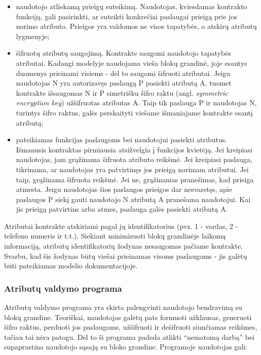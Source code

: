 \begin{itemize}
    \item naudotojo atliekamą prieigų suteikimą. Naudotojas, kviesdamas kontrakto funkciją, gali pasirinkti,
    ar suteikti konkrečiai paslaugai prieigą prie jos norimo atributo. Prieigos yra valdomos ne visos tapatybės, o
    atskirų atributų lygmenyje;

    \item šifruotų atributų saugojimą. Kontrakte saugomi naudotojo tapatybės atributai. Kadangi modelyje naudojama vieša blokų
    grandinė, joje esantys duomenys prieinami visiems - dėl to saugomi šifruoti atributai. Jeigu naudotojas N
    yra autorizavęs paslaugą P pasiekti atributą A, tuomet kontrakte išsaugomas N ir P simetrišku šifro raktu (angl.
    \textit{symmetric encryption key}) užšifruotas atributas A. Taip tik paslauga P
    ir naudotojas N, turintys šifro raktus, galės perskaityti viešame išmaniajame kontrakte esantį atributą;

    \item pateikiamas funkcijas paslaugoms bei naudotojui pasiekti atributus. Išmanusis kontraktas pirmiausia atsižvelgia
    į funkcijos kvietėją. Jei kreipiasi naudotojas, jam grąžinama šifruota atributo reikšmė. Jei kreipiasi paslauga, tikrinama,
    ar naudotojas yra patvirtinęs jos prieigą norimam atributui. Jei taip, grąžinama šifruota reikšmė. Jei ne, grąžinamas pranešimas,
    kad prieiga atmesta. Jeigu naudotojas šios paslaugos prieigos dar nesvarstęs, apie paslaugos P siekį gauti naudotojo N atributą A
    pranešama naudotojui. Kai jis prieigą patvirtins arba atmes, paslauga galės pasiekti atributą A.
\end{itemize}

Atributai kontrakte atskiriami
pagal jų identifikatorius (pvz. 1 - vardas, 2 - telefono numeris ir t.t.).
Siekiant minimizuoti blokų grandinėje laikomą informaciją, atributų identifikatorių
žodynas nesaugomas pačiame kontrakte. Svarbu, kad šis žodynas būtų viešai prieinamas visoms paslaugoms - jis
galėtų būti pateikiamas modelio dokumentacijoje.

\subsubsection{Atributų valdymo programa}

Atributų valdymo programa yra skirta palengvinti naudotojo bendravimą su blokų grandine. Teoriškai, naudotojas galėtų pats formuoti užklausas,
generuoti šifro raktus, perduoti jos paslaugoms, užšifruoti ir dešifruoti siunčiamas reikšmes, tačiau tai nėra patogu. Dėl to ši
programa padeda atlikti \enquote{nematomą darbą} bei supaprastina naudotojo sąsają su bloko grandine. Programoje naudotojas gali:

